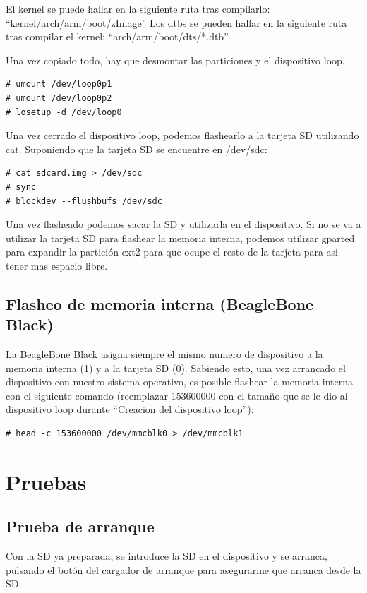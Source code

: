 \documentclass{tfg}
\begin{document}
El kernel se puede hallar en la siguiente ruta tras compilarlo: ``kernel/arch/arm/boot/zImage''
Los dtbs se pueden hallar en la siguiente ruta tras compilar el kernel: ``arch/arm/boot/dts/*.dtb''

Una vez copiado todo, hay que desmontar las particiones y el dispositivo loop.
\begin{lstlisting}[caption=Desmontado del loop]
# umount /dev/loop0p1
# umount /dev/loop0p2
# losetup -d /dev/loop0
\end{lstlisting}

Una vez cerrado el dispositivo loop, podemos flashearlo a la tarjeta SD utilizando cat. Suponiendo que la tarjeta SD se encuentre en /dev/sdc:
\begin{lstlisting}[caption=Flasheado de la tarjeta SD]
# cat sdcard.img > /dev/sdc
# sync
# blockdev --flushbufs /dev/sdc
\end{lstlisting}

Una vez flasheado podemos sacar la SD y utilizarla en el dispositivo. Si no se va a utilizar la tarjeta SD para flashear la memoria interna, podemos utilizar gparted para expandir la partición ext2 para que ocupe el resto de la tarjeta para asi tener mas espacio libre.

\section{Flasheo de memoria interna (BeagleBone Black)}
La BeagleBone Black asigna siempre el mismo numero de dispositivo a la memoria interna (1) y a la tarjeta SD (0). Sabiendo esto, una vez arrancado el dispositivo con nuestro sistema operativo, es posible flashear la memoria interna con el siguiente comando (reemplazar 153600000 con el tamaño que se le dio al dispositivo loop durante ``Creacion del dispositivo loop''):
\begin{lstlisting}[caption=Flasheo de la memoria interna]
# head -c 153600000 /dev/mmcblk0 > /dev/mmcblk1
\end{lstlisting}

\chapter{Pruebas}
\section{Prueba de arranque}
Con la SD ya preparada, se introduce la SD en el dispositivo y se arranca, pulsando el botón del cargador de arranque para asegurarme que arranca desde la SD.
\end{document}
